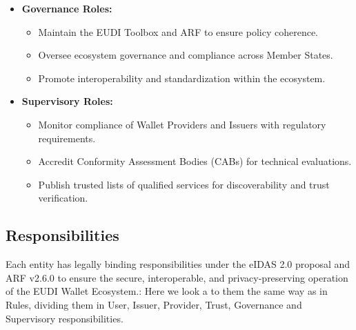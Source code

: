 \documentclass[sigconf,balance,nonacm,authordraft]{acmart}
\begin{document}
\begin{itemize}
  \item \textbf{Governance Roles:}
    \begin{itemize}
      \item Maintain the EUDI Toolbox and ARF to ensure policy coherence.
      \item Oversee ecosystem governance and compliance across Member States.
      \item Promote interoperability and standardization within the ecosystem.
    \end{itemize}

  \item \textbf{Supervisory Roles:}
    \begin{itemize}
      \item Monitor compliance of Wallet Providers and Issuers with regulatory requirements.
      \item Accredit Conformity Assessment Bodies (CABs) for technical evaluations.
      \item Publish trusted lists of qualified services for discoverability and trust verification.
    \end{itemize}
\end{itemize} 
\subsection{Responsibilities}
Each entity has legally binding responsibilities under the eIDAS 2.0 proposal and ARF v2.6.0 to ensure the secure, interoperable, and privacy-preserving operation of the EUDI Wallet Ecosystem.:
Here we look a to them the same way as in Rules, dividing them in User, Issuer, Provider, Trust, Governance and Supervisory responsibilities.
\end{document}
